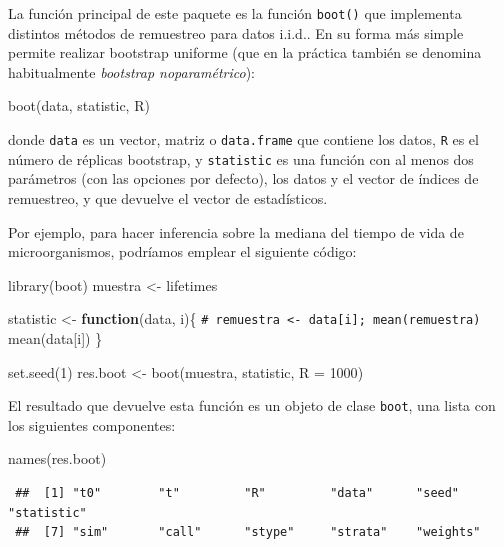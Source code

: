\documentclass[
]{book}
\newenvironment{Shaded}{\begin{snugshade}}{\end{snugshade}}
\newcommand{\AttributeTok}[1]{\textcolor[rgb]{0.77,0.63,0.00}{#1}}
\newcommand{\CommentTok}[1]{\textcolor[rgb]{0.56,0.35,0.01}{\textit{#1}}}
\newcommand{\ControlFlowTok}[1]{\textcolor[rgb]{0.13,0.29,0.53}{\textbf{#1}}}
\newcommand{\DecValTok}[1]{\textcolor[rgb]{0.00,0.00,0.81}{#1}}
\newcommand{\FunctionTok}[1]{\textcolor[rgb]{0.00,0.00,0.00}{#1}}
\newcommand{\NormalTok}[1]{#1}
\newcommand{\OtherTok}[1]{\textcolor[rgb]{0.56,0.35,0.01}{#1}}
\theoremstyle{break}
\theoremstyle{nonumberplain}
\renewcommand{\CommentTok}[1]{\textcolor[rgb]{0.41,0.41,0.41}{\texttt{#1}}}
\begin{document}
La función principal de este paquete es la función \texttt{boot()} que implementa distintos métodos de remuestreo para datos i.i.d..
En su forma más simple permite realizar bootstrap uniforme (que en la práctica también se denomina habitualmente \emph{bootstrap noparamétrico}):

\begin{Shaded}
\begin{Highlighting}[]
\FunctionTok{boot}\NormalTok{(data, statistic, R)}
\end{Highlighting}
\end{Shaded}

donde \texttt{data} es un vector, matriz o \texttt{data.frame} que contiene los datos,
\texttt{R} es el número de réplicas bootstrap, y \texttt{statistic} es una función
con al menos dos parámetros (con las opciones por defecto),
los datos y el vector de índices de remuestreo,
y que devuelve el vector de estadísticos.

Por ejemplo, para hacer inferencia sobre la mediana del tiempo de vida de microorganismos,
podríamos emplear el siguiente código:

\begin{Shaded}
\begin{Highlighting}[]
\FunctionTok{library}\NormalTok{(boot)}
\NormalTok{muestra }\OtherTok{\textless{}{-}}\NormalTok{ lifetimes}

\NormalTok{statistic }\OtherTok{\textless{}{-}} \ControlFlowTok{function}\NormalTok{(data, i)\{}
  \CommentTok{\# remuestra \textless{}{-} data[i]; mean(remuestra)}
  \FunctionTok{mean}\NormalTok{(data[i])}
\NormalTok{\}}

\FunctionTok{set.seed}\NormalTok{(}\DecValTok{1}\NormalTok{)}
\NormalTok{res.boot }\OtherTok{\textless{}{-}} \FunctionTok{boot}\NormalTok{(muestra, statistic, }\AttributeTok{R =} \DecValTok{1000}\NormalTok{)}
\end{Highlighting}
\end{Shaded}

El resultado que devuelve esta función es un objeto de clase \texttt{boot}, una lista con los siguientes componentes:

\begin{Shaded}
\begin{Highlighting}[]
\FunctionTok{names}\NormalTok{(res.boot)}
\end{Highlighting}
\end{Shaded}

\begin{verbatim}
 ##  [1] "t0"        "t"         "R"         "data"      "seed"      "statistic"
 ##  [7] "sim"       "call"      "stype"     "strata"    "weights"
\end{verbatim}
\end{document}
